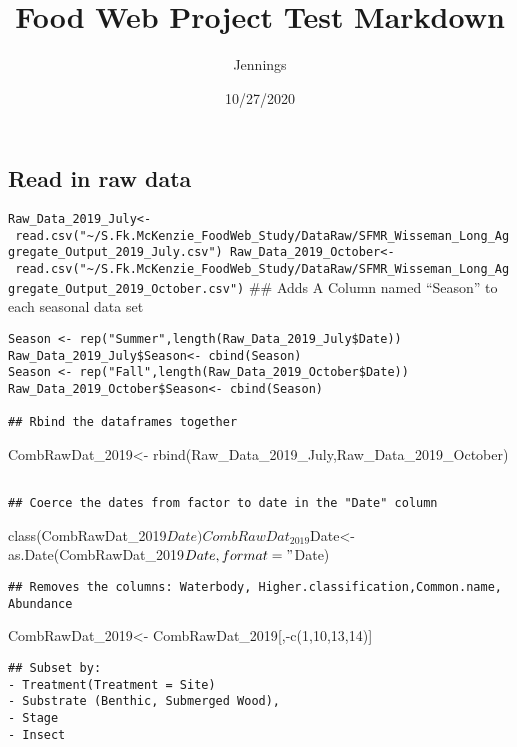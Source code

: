 \documentclass[
]{article}
\title{Food Web Project Test Markdown}
\author{Jennings}
\date{10/27/2020}
\begin{document}
\maketitle

\hypertarget{read-in-raw-data}{%
\subsection{Read in raw data}\label{read-in-raw-data}}

\texttt{Raw\_Data\_2019\_July\textless{}-\ read.csv("\textasciitilde{}/S.Fk.McKenzie\_FoodWeb\_Study/DataRaw/SFMR\_Wisseman\_Long\_Aggregate\_Output\_2019\_July.csv")\ Raw\_Data\_2019\_October\textless{}-\ read.csv("\textasciitilde{}/S.Fk.McKenzie\_FoodWeb\_Study/DataRaw/SFMR\_Wisseman\_Long\_Aggregate\_Output\_2019\_October.csv")}
\#\# Adds A Column named ``Season'' to each seasonal data set

\begin{verbatim}
Season <- rep("Summer",length(Raw_Data_2019_July$Date))
Raw_Data_2019_July$Season<- cbind(Season)
Season <- rep("Fall",length(Raw_Data_2019_October$Date))
Raw_Data_2019_October$Season<- cbind(Season)

## Rbind the dataframes together
\end{verbatim}

CombRawDat\_2019\textless-
rbind(Raw\_Data\_2019\_July,Raw\_Data\_2019\_October)

\begin{verbatim}

## Coerce the dates from factor to date in the "Date" column
\end{verbatim}

class(CombRawDat\_2019\(Date) CombRawDat_2019\)Date\textless-
as.Date(CombRawDat\_2019\(Date, format="%
\)Date)

\begin{verbatim}
## Removes the columns: Waterbody, Higher.classification,Common.name, Abundance  
\end{verbatim}

CombRawDat\_2019\textless- CombRawDat\_2019{[},-c(1,10,13,14){]}

\begin{verbatim}
## Subset by: 
- Treatment(Treatment = Site)
- Substrate (Benthic, Submerged Wood), 
- Stage
- Insect
\end{verbatim}
\end{document}
